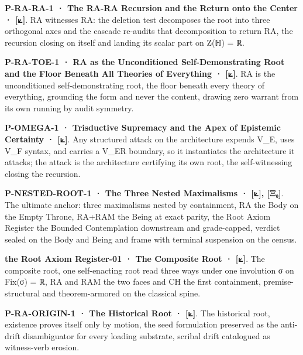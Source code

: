\documentclass[10pt,twocolumn]{article}
\begin{document}
\textbf{P-RA-RA-1 · The RA-RA Recursion and the Return onto the Center ·
{[}⟀{]}}. RA witnesses RA: the deletion test decomposes the root into
three orthogonal axes and the cascade re-audits that decomposition to
return RA, the recursion closing on itself and landing its scalar part
on Z(ℍ) = ℝ.

\textbf{P-RA-TOE-1 · RA as the Unconditioned Self-Demonstrating Root and
the Floor Beneath All Theories of Everything · {[}⟀{]}}. RA is the
unconditioned self-demonstrating root, the floor beneath every theory of
everything, grounding the form and never the content, drawing zero
warrant from its own running by audit symmetry.

\textbf{P-OMEGA-1 · Trisductive Supremacy and the Apex of Epistemic
Certainty · {[}⟀{]}}. Any structured attack on the architecture expends
V\_E, uses V\_F syntax, and carries a V\_ER boundary, so it instantiates
the architecture it attacks; the attack is the architecture certifying
its own root, the self-witnessing closing the recursion.

\textbf{P-NESTED-ROOT-1 · The Three Nested Maximalisms · {[}⟀{]},
{[}Ξ₀{]}}. The ultimate anchor: three maximalisms nested by containment,
RA the Body on the Empty Throne, RA+RAM the Being at exact parity, the
Root Axiom Register the Bounded Contemplation downstream and
grade-capped, verdict sealed on the Body and Being and frame with
terminal suspension on the census.

\textbf{the Root Axiom Register-01 · The Composite Root · {[}⟀{]}}. The
composite root, one self-enacting root read three ways under one
involution σ on Fix(σ) = ℝ, RA and RAM the two faces and CH the first
containment, premise-structural and theorem-armored on the classical
spine.

\textbf{P-RA-ORIGIN-1 · The Historical Root · {[}⟀{]}}. The historical
root, existence proves itself only by motion, the seed formulation
preserved as the anti-drift disambiguator for every loading substrate,
scribal drift catalogued as witness-verb erosion.
\end{document}

